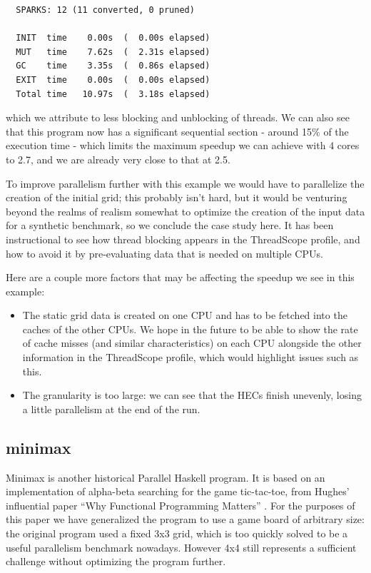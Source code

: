 \documentclass[twocolumn,9pt]{sigplanconf}
\let\cite=\citep
\begin{document}
\begin{verbatim}
  SPARKS: 12 (11 converted, 0 pruned)

  INIT  time    0.00s  (  0.00s elapsed)
  MUT   time    7.62s  (  2.31s elapsed)
  GC    time    3.35s  (  0.86s elapsed)
  EXIT  time    0.00s  (  0.00s elapsed)
  Total time   10.97s  (  3.18s elapsed)
\end{verbatim}
which we attribute to less blocking and unblocking of threads.  We can
also see that this program now has a significant sequential section -
around 15\% of the execution time - which limits the maximum speedup
we can achieve with 4 cores to 2.7, and we are already very close to
that at 2.5.

To improve parallelism further with this example we would have to
parallelize the creation of the initial grid; this probably isn't
hard, but it would be venturing beyond the realms of realism somewhat
to optimize the creation of the input data for a synthetic benchmark,
so we conclude the case study here.  It has been instructional to see
how thread blocking appears in the ThreadScope profile, and how to
avoid it by pre-evaluating data that is needed on multiple CPUs.

Here are a couple more factors that may be affecting the speedup we
see in this example:

\begin{itemize}
\item The static grid data is created on one CPU and has to be fetched
  into the caches of the other CPUs.  We hope in the future to be able
  to show the rate of cache misses (and similar characteristics) on
  each CPU alongside the other information in the ThreadScope profile,
  which would highlight issues such as this.
\item The granularity is too large: we can see that the HECs finish
  unevenly, losing a little parallelism at the end of the run.
\end{itemize}

\subsection{minimax}

Minimax is another historical Parallel Haskell program.  It is based
on an implementation of alpha-beta searching for the game tic-tac-toe,
from Hughes' influential paper ``Why Functional Programming Matters''
\cite{hughes:why-fp-matters}.  For the purposes of this paper we have generalized the
program to use a game board of arbitrary size: the original program
used a fixed 3x3 grid, which is too quickly solved to be a useful
parallelism benchmark nowadays.  However 4x4 still represents a
sufficient challenge without optimizing the program further.
\end{document}
